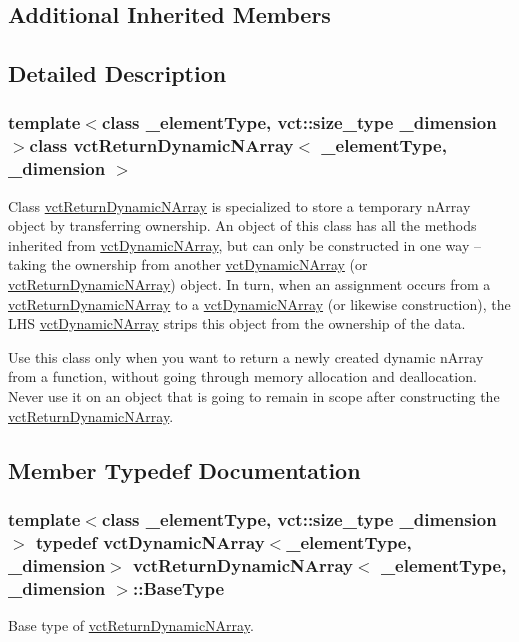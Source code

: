 \subsection*{Additional Inherited Members}


\subsection{Detailed Description}
\subsubsection*{template$<$class \-\_\-element\-Type, vct\-::size\-\_\-type \-\_\-dimension$>$class vct\-Return\-Dynamic\-N\-Array$<$ \-\_\-element\-Type, \-\_\-dimension $>$}

Class \hyperlink{classvct_return_dynamic_n_array}{vct\-Return\-Dynamic\-N\-Array} is specialized to store a temporary n\-Array object by transferring ownership. An object of this class has all the methods inherited from \hyperlink{classvct_dynamic_n_array}{vct\-Dynamic\-N\-Array}, but can only be constructed in one way -- taking the ownership from another \hyperlink{classvct_dynamic_n_array}{vct\-Dynamic\-N\-Array} (or \hyperlink{classvct_return_dynamic_n_array}{vct\-Return\-Dynamic\-N\-Array}) object. In turn, when an assignment occurs from a \hyperlink{classvct_return_dynamic_n_array}{vct\-Return\-Dynamic\-N\-Array} to a \hyperlink{classvct_dynamic_n_array}{vct\-Dynamic\-N\-Array} (or likewise construction), the L\-H\-S \hyperlink{classvct_dynamic_n_array}{vct\-Dynamic\-N\-Array} strips this object from the ownership of the data.

Use this class only when you want to return a newly created dynamic n\-Array from a function, without going through memory allocation and deallocation. Never use it on an object that is going to remain in scope after constructing the \hyperlink{classvct_return_dynamic_n_array}{vct\-Return\-Dynamic\-N\-Array}. 

\subsection{Member Typedef Documentation}
\hypertarget{classvct_return_dynamic_n_array_a35849019078c617ed43b530c49f0cfe8}{
\subsubsection[{Base\-Type}]{\setlength{\rightskip}{0pt plus 5cm}template$<$class \-\_\-element\-Type, vct\-::size\-\_\-type \-\_\-dimension$>$ typedef {\bf vct\-Dynamic\-N\-Array}$<$\-\_\-element\-Type, \-\_\-dimension$>$ {\bf vct\-Return\-Dynamic\-N\-Array}$<$ \-\_\-element\-Type, \-\_\-dimension $>$\-::{\bf Base\-Type}}}\label{classvct_return_dynamic_n_array_a35849019078c617ed43b530c49f0cfe8}
Base type of \hyperlink{classvct_return_dynamic_n_array}{vct\-Return\-Dynamic\-N\-Array}. 

